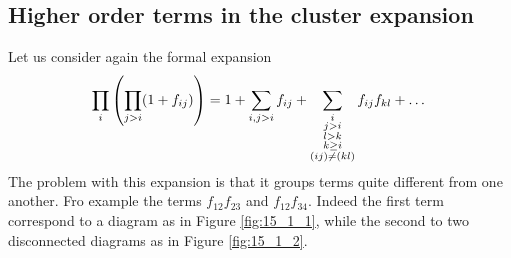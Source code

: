 \documentclass[../main/main.tex]{subfiles}
\begin{document}
\subsection{Higher order terms in the cluster expansion}
Let us consider again the formal expansion
\begin{equation*}
  \prod_{i}^{} \qty(\prod_{j>i}^{} (1+f_{ij}) ) = 1 + \sum_{i,j>i}^{} f_{ij}
  + \sum_{\substack{ i \\ j>i \\ l>k \\ k \ge i \\ (ij) \neq (kl)} }^{} f_{ij} f_{kl}     + \dots
\end{equation*}
The problem with this expansion is that it groups terms quite different from one another. Fro example the terms \( f_{12}f_{23} \) and \( f_{12}f_{34} \). Indeed the first term correspond to a diagram as in Figure \ref{fig:15_1_1}, while the second to two disconnected diagrams as in Figure \ref{fig:15_1_2}.
\begin{figure}[h!]
\begin{minipage}[c]{0.5\linewidth}
\end{minipage}
\begin{minipage}[]{0.5\linewidth}
\centering
{}
\end{minipage}
\caption{\label{fig:} }
\end{figure}
\end{document}
